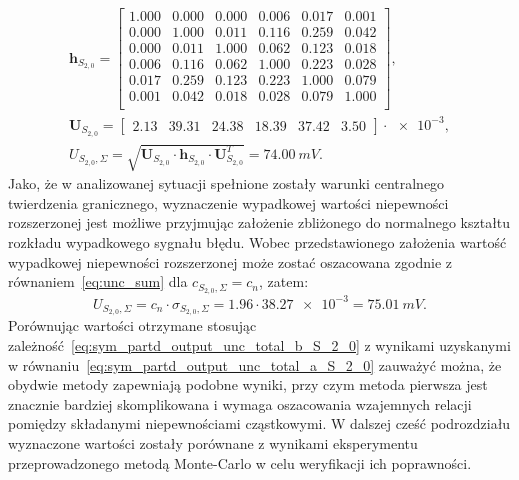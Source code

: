 \begin{gather}
\mathbf{h}_{S_{2,0}} =
\begin{bmatrix}
\num{1.000} & \num{0.000} & \num{0.000} & \num{0.006} & \num{0.017} & \num{0.001} \\
\num{0.000} & \num{1.000} & \num{0.011} & \num{0.116} & \num{0.259} & \num{0.042} \\
\num{0.000} & \num{0.011} & \num{1.000} & \num{0.062} & \num{0.123} & \num{0.018} \\
\num{0.006} & \num{0.116} & \num{0.062} & \num{1.000} & \num{0.223} & \num{0.028} \\
\num{0.017} & \num{0.259} & \num{0.123} & \num{0.223} & \num{1.000} & \num{0.079} \\
\num{0.001} & \num{0.042} & \num{0.018} & \num{0.028} & \num{0.079} & \num{1.000} \\
\end{bmatrix}
\label{eq:sym_partd_output_unc_sumcoherval_S_2_0_a}, \\
\mathbf{U}_{S_{2,0}} =
\begin{bmatrix}
\num{2.13} & \num{39.31} & \num{24.38} & \num{18.39} & \num{37.42} & \num{3.50}
\end{bmatrix} \cdot \num{e-3}
\label{eq:sym_partd_output_unc_sumuvectval_S_2_0_a}, \\
U_{S_{2,0},\Sigma} = \sqrt{\mathbf{U}_{S_{2,0}} \cdot \mathbf{h}_{S_{2,0}} \cdot \mathbf{U}_{S_{2,0}}^{T}} = \qty{74.00}{mV} \label{eq:sym_partd_output_unc_total_a_S_2_0}.
\end{gather}
Jako, że w analizowanej sytuacji spełnione zostały warunki centralnego twierdzenia granicznego, wyznaczenie wypadkowej wartości niepewności rozszerzonej jest możliwe przyjmując założenie zbliżonego do normalnego kształtu rozkładu wypadkowego sygnału błędu. Wobec przedstawionego założenia wartość wypadkowej niepewności rozszerzonej może zostać oszacowana zgodnie z równaniem~\eqref{eq:unc_sum} dla $c_{S_{2,0},\Sigma} = c_{n}$, zatem:
\begin{equation}
U_{S_{2,0},\Sigma} = c_{n} \cdot \sigma_{S_{2,0},\Sigma} = \num{1.96} \cdot \num{38.27e-3} = \qty{75.01}{mV} \label{eq:sym_partd_output_unc_total_b_S_2_0}.
\end{equation}
Porównując wartości otrzymane stosując zależność~\eqref{eq:sym_partd_output_unc_total_b_S_2_0} z wynikami uzyskanymi w równaniu~\eqref{eq:sym_partd_output_unc_total_a_S_2_0} zauważyć można, że obydwie metody zapewniają podobne wyniki, przy czym metoda pierwsza jest znacznie bardziej skomplikowana i wymaga oszacowania wzajemnych relacji pomiędzy składanymi niepewnościami cząstkowymi. W dalszej cześć podrozdziału wyznaczone wartości zostały porównane z wynikami eksperymentu przeprowadzonego metodą Monte-Carlo w celu weryfikacji ich poprawności.

